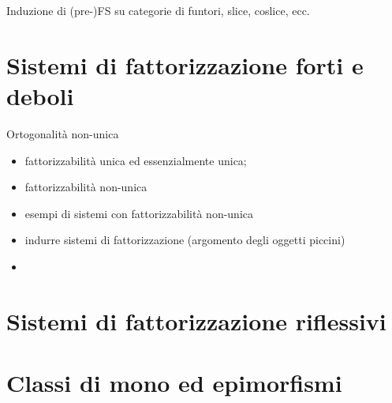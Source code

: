 \begin{example}
	Induzione di (pre-)FS su categorie di funtori, slice, coslice, ecc.
\end{example}

\begin{esercizi}
	\item
	\item
	\item
	\item
	\item
\end{esercizi}
\section[Fattorizzazione]{Sistemi di fattorizzazione forti e deboli}
Ortogonalità non-unica
\begin{itemize}
	\item fattorizzabilità unica ed essenzialmente unica;
	\item fattorizzabilità non-unica
	\item esempi di sistemi con fattorizzabilità non-unica
	\item indurre sistemi di fattorizzazione (argomento degli oggetti piccini)
	\item
\end{itemize}
\begin{esercizi}
	\item
	\item
	\item
	\item
	\item
\end{esercizi}
\section[Riflessività]{Sistemi di fattorizzazione riflessivi}
\begin{esercizi}
	\item
	\item
	\item
	\item
	\item
\end{esercizi}
\section[Mono ed epimorfismi]{Classi di mono ed epimorfismi}
\begin{esercizi}
	\item
	\item
	\item
	\item
	\item
\end{esercizi}
